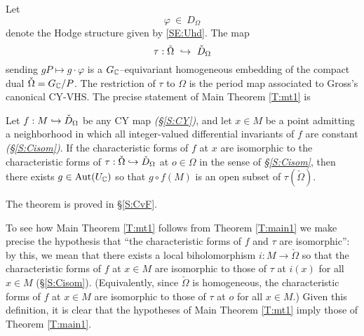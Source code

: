 \documentclass[12pt]{amsart}
\numberwithin{equation}{section}
\numberwithin{table}{section}
\numberwithin{figure}{section}
\begin{document}
Let 
\[
  \varphi \ \in \ D_\Omega
\]
denote the Hodge structure given by \eqref{SE:Uhd}.  The map
\begin{equation}\label{E:tau}
   \tau : \check \Omega \ \hookrightarrow \ \check D_\Omega
\end{equation}
sending $gP \mapsto g \cdot \varphi$ is a $G_\mathbb C$--equivariant homogeneous embedding of the compact dual $\check \Omega = G_\mathbb C/P$.  The restriction of $\tau$ to $\Omega$ is the period map associated to Gross's canonical CY-VHS.  The precise statement of Main Theorem \ref{T:mt1} is 

\begin{theorem} \label{T:main1}
Let $f : M \hookrightarrow \check D_\Omega$ be any CY map \emph{(\S\ref{S:CY})}, and let $x \in M$ be a point admitting a neighborhood in which all integer-valued differential invariants of $f$ are constant \emph{(\S\ref{S:Cisom})}.  If the characteristic forms of $f$ at $x$ are isomorphic to the characteristic forms of $\tau : \check\Omega \hookrightarrow \check D_\Omega$ at $o \in \Omega$ in the sense of \emph{\S\ref{S:Cisom}}, then there exists $g \in \mathrm{Aut}(U_\mathbb C)$ so that $g \circ f(M)$ is an open subset of $\tau(\check \Omega)$.
\end{theorem}

\noindent The theorem is proved in \S\ref{S:CvF}.

\begin{remark}  \label{R:main1}
To see how Main Theorem \ref{T:mt1} follows from Theorem \ref{T:main1} we make precise the hypothesis that ``the characteristic forms of $f$ and $\tau$ are isomorphic'':  by this, we mean that there exists a local biholomorphism $i : M \to \check\Omega$ so that the characteristic forms of $f$ at $x \in M$ are isomorphic to those of $\tau$ at $i(x)$ for all $x\in M$ (\cf\S\ref{S:Cisom}).  (Equivalently, since $\check\Omega$ is homogeneous, the characteristic forms of $f$ at $x \in M$ are isomorphic to those of $\tau$ at $o$ for all $x \in M$.)  Given this definition, it is clear that the hypotheses of Main Theorem \ref{T:mt1} imply those of Theorem \ref{T:main1}.
\end{remark}
\end{document}
